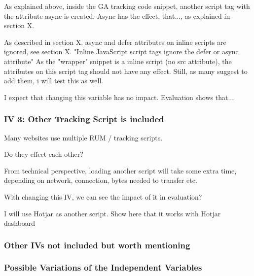 As explained above, inside the GA tracking code snippet, another script tag with the attribute async is created.
Async has the effect, that..., as explained in section X.

As described in section X. async and defer attributes on inline scripts are ignored, see section X.
"Inline JavaScript script tags ignore the defer or async attribute"
As the "wrapper" snippet is a inline script (no src attribute), the attributes on this script tag should not have any effect.
Still, as many suggest to add them, i will test this as well.

I expect that changing this variable has no impact.
Evaluation shows that...




\subsubsection{IV 3: Other Tracking Script is included}

Many websites use multiple RUM / tracking scripts.

Do they effect each other?

From technical perspective, loading another script will take some extra time, depending on network, connection, bytes needed to transfer etc.

With changing this IV, we can see the impact of it in evaluation?

I will use Hotjar as another script.
Show here that it works with Hotjar dashboard



\subsubsection{Other IVs not included but worth mentioning}




\subsubsection{Possible Variations of the Independent Variables}

